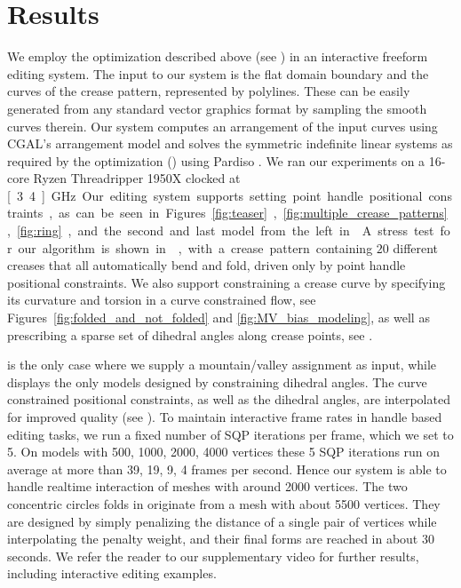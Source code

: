 \section{Results} \label{sec:results}

We employ the optimization described above (see ) in an interactive freeform editing system. The input to our system is the flat domain boundary and the curves of the crease pattern, represented by polylines. These can be easily generated from any standard vector graphics format by sampling the smooth curves therein. Our system computes an arrangement of the input curves using CGAL's arrangement model \cite{cgal,cgal_arr1,cgal_arr2} and solves the symmetric indefinite  linear systems as required by the optimization () using Pardiso \cite{PARDISO1,PARDISO2,PARDISO3}. We ran our experiments on a 16-core Ryzen Threadripper 1950X clocked at \unit[3.4]{GHz}. Our editing system supports setting point handle positional constraints, as can be seen in Figures \ref{fig:teaser}, \ref{fig:multiple_crease_patterns}, \ref{fig:ring}, and the second and last model from the left in . A stress test for our algorithm is shown in , with a crease pattern containing $20$ different creases that all automatically bend and fold, driven only by point handle positional constraints. We also support  constraining a crease curve by specifying its curvature and torsion in a curve constrained flow,  see Figures~\ref{fig:folded_and_not_folded} and \ref{fig:MV_bias_modeling}, as well as prescribing a sparse set of dihedral angles along crease points, see . 

 is the only case where we supply a mountain/valley assignment as input, while  displays the only models designed by constraining dihedral angles. The curve constrained positional constraints, as well as the dihedral angles, are interpolated for improved quality (see ). To maintain interactive frame rates in handle based editing tasks, we run a fixed number of SQP iterations per frame, which we set to 5. On models with 500, 1000, 2000, 4000 vertices these 5 SQP iterations run on average at more than 39, 19, 9, 4 frames per second. Hence our system is able to handle realtime interaction of meshes with around 2000 vertices. The two concentric circles folds in  originate from a mesh with about 5500 vertices. They are designed by simply penalizing the distance of a single pair of vertices while interpolating the penalty weight, and their final forms are reached in about 30 seconds. We refer the reader to our supplementary video for further results, including interactive editing examples. 

